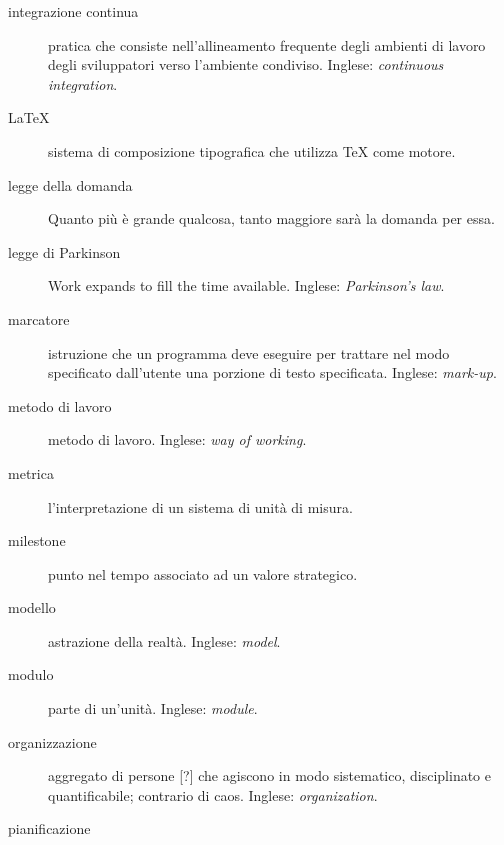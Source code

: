 \documentclass[a4paper]{article}
\begin{document}
\begin{description}
	\item[integrazione continua] 

			pratica che consiste nell'allineamento frequente degli ambienti di lavoro degli sviluppatori verso l'ambiente condiviso. Inglese: \emph{continuous integration}.
			
	\item[LaTeX] 

			sistema di composizione tipografica che utilizza TeX come motore.
			
	\item[legge della domanda] 

			Quanto più è grande qualcosa, tanto maggiore sarà la domanda per essa.
			
	\item[legge di Parkinson] 

			Work expands to fill the time available. Inglese: \emph{Parkinson's law}.
			
	\item[marcatore] 

			istruzione che un programma deve eseguire per trattare nel modo specificato dall'utente una porzione di testo specificata. Inglese: \emph{mark-up}.
			
	\item[metodo di lavoro] 

			metodo di lavoro. Inglese: \emph{way of working}.
			
	\item[metrica] 

			l'interpretazione di un sistema di unità di misura.
			
	\item[milestone] 

			punto nel tempo associato ad un valore strategico.
			
	\item[modello] 

			astrazione della realtà. Inglese: \emph{model}.
			
	\item[modulo] 

			parte di un'unità. Inglese: \emph{module}.
			
	\item[organizzazione] 

			aggregato di persone [?] che agiscono in modo sistematico, disciplinato e quantificabile; contrario di caos. Inglese: \emph{organization}.
			
	\item[pianificazione] 


\end{description}
\end{document}
